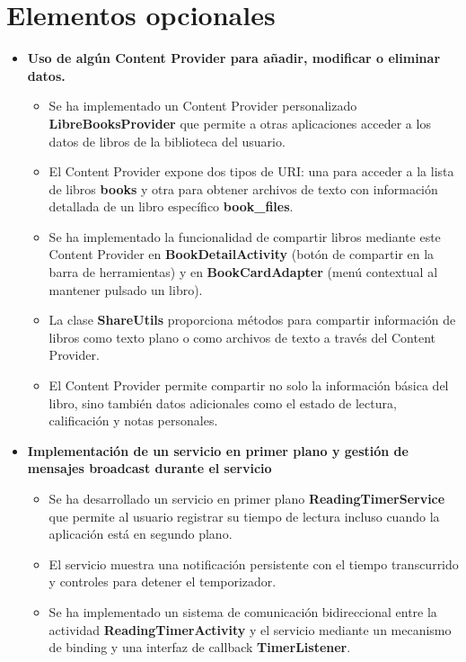 \documentclass[a4paper,11pt]{report}
\begin{document}
    \section{Elementos opcionales}
      \begin{itemize}
        \item \textbf{Uso de algún Content Provider para añadir, modificar o eliminar datos.}
          \begin{itemize}
            \item Se ha implementado un Content Provider personalizado \textbf{LibreBooksProvider} que permite a otras aplicaciones acceder a los datos de libros de la biblioteca del usuario.
            \item El Content Provider expone dos tipos de URI: una para acceder a la lista de libros \textbf{books} y otra para obtener archivos de texto con información detallada de un libro específico \textbf{book\_files}.
            \item Se ha implementado la funcionalidad de compartir libros mediante este Content Provider en \textbf{BookDetailActivity} (botón de compartir en la barra de herramientas) y en \textbf{BookCardAdapter} (menú contextual al mantener pulsado un libro).
            \item La clase \textbf{ShareUtils} proporciona métodos para compartir información de libros como texto plano o como archivos de texto a través del Content Provider.
            \item El Content Provider permite compartir no solo la información básica del libro, sino también datos adicionales como el estado de lectura, calificación y notas personales.
          \end{itemize}
        \item \textbf{Implementación de un servicio en primer plano y gestión de mensajes broadcast durante el servicio}
          \begin{itemize}
            \item Se ha desarrollado un servicio en primer plano \textbf{ReadingTimerService} que permite al usuario registrar su tiempo de lectura incluso cuando la aplicación está en segundo plano.
            \item El servicio muestra una notificación persistente con el tiempo transcurrido y controles para detener el temporizador.
            \item Se ha implementado un sistema de comunicación bidireccional entre la actividad \textbf{ReadingTimerActivity} y el servicio mediante un mecanismo de binding y una interfaz de callback \textbf{TimerListener}.

\end{itemize}
\end{itemize}
\end{document}
